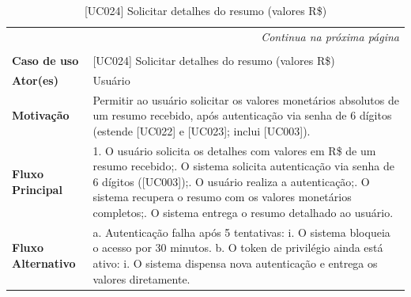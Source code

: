 {\small
\begin{longtable}{|p{3.5cm}|p{11.0cm}|}
\caption{[UC024] Solicitar detalhes do resumo (valores R\$)} \label{quad:uc024} \\
\endfirsthead
\multicolumn{2}{r}{\fontsize{10pt}{10pt}\selectfont\textit{Continua na próxima página}} \\
\endfoot
\hline
\multicolumn{2}{c}{\fontsize{10pt}{10pt}\selectfont\textbf{Fonte:} Elaborado pelos autores (2026).} \\
\endlastfoot
\hline
\textbf{Caso de uso} & [UC024] Solicitar detalhes do resumo (valores R\$) \\ \hline
\textbf{Ator(es)} & Usuário \\ \hline
\textbf{Motivação} & Permitir ao usuário solicitar os valores monetários absolutos de um resumo recebido, após autenticação via senha de 6 dígitos (estende [UC022] e [UC023]; inclui [UC003]). \\ \hline
\textbf{Fluxo Principal} &
1. O usuário solicita os detalhes com valores em R\$ de um resumo recebido;\newline
2. O sistema solicita autenticação via senha de 6 dígitos ([UC003]);\newline
3. O usuário realiza a autenticação;\newline
4. O sistema recupera o resumo com os valores monetários completos;\newline
5. O sistema entrega o resumo detalhado ao usuário.
\\ \hline
\textbf{Fluxo Alternativo} &
a. Autenticação falha após 5 tentativas:\newline
\hspace*{1em}i. O sistema bloqueia o acesso por 30 minutos.\newline
b. O token de privilégio ainda está ativo:\newline
\hspace*{1em}i. O sistema dispensa nova autenticação e entrega os valores diretamente.
\\ \hline
\end{longtable}
}

\vspace{4pt}

